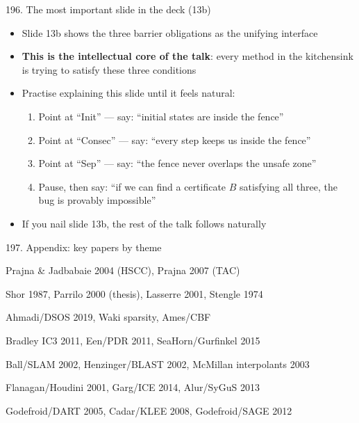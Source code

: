 \documentclass[aspectratio=169]{beamer}
\begin{document}
\begin{frame}{196. The most important slide in the deck (13b)}
\begin{itemize}
  \item Slide 13b shows the three barrier obligations as the unifying interface
  \item \textbf{This is the intellectual core of the talk}: every method in the kitchensink is trying to satisfy these three conditions
  \item Practise explaining this slide until it feels natural:
    \begin{enumerate}
      \item Point at ``Init'' --- say: ``initial states are inside the fence''
      \item Point at ``Consec'' --- say: ``every step keeps us inside the fence''  
      \item Point at ``Sep'' --- say: ``the fence never overlaps the unsafe zone''
      \item Pause, then say: ``if we can find a certificate \(B\) satisfying all three, the bug is provably impossible''
    \end{enumerate}
  \item If you nail slide 13b, the rest of the talk follows naturally
\end{itemize}
\end{frame}

\begin{frame}{197. Appendix: key papers by theme}
\begin{description}
  \item[Control-theory origin] Prajna \& Jadbabaie 2004 (HSCC), Prajna 2007 (TAC)
  \item[SOS foundations] Shor 1987, Parrilo 2000 (thesis), Lasserre 2001, Stengle 1974
  \item[Tractable relaxations] Ahmadi/DSOS 2019, Waki sparsity, Ames/CBF
  \item[Clause-based invariants] Bradley IC3 2011, Een/PDR 2011, SeaHorn/Gurfinkel 2015
  \item[Predicate abstraction] Ball/SLAM 2002, Henzinger/BLAST 2002, McMillan interpolants 2003
  \item[Invariant synthesis] Flanagan/Houdini 2001, Garg/ICE 2014, Alur/SyGuS 2013
  \item[Concolic testing] Godefroid/DART 2005, Cadar/KLEE 2008, Godefroid/SAGE 2012
\end{description}
\end{frame}
\end{document}
